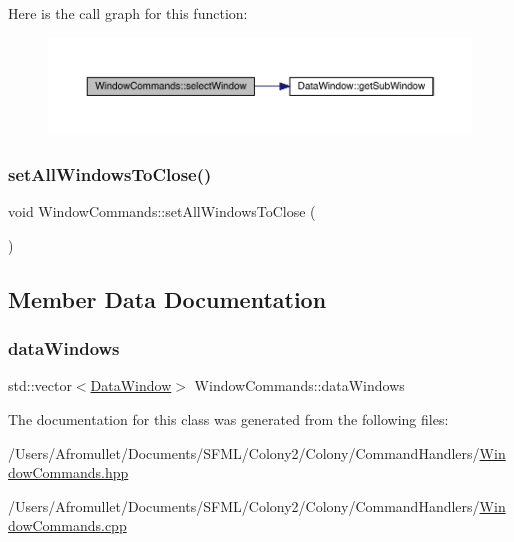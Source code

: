 Here is the call graph for this function\+:
\nopagebreak
\begin{figure}[H]
\begin{center}
\leavevmode
\includegraphics[width=350pt]{class_window_commands_a0e61beaebffb12c489ee277b84f74248_cgraph}
\end{center}
\end{figure}
\mbox{\label{class_window_commands_ac52c784736000a50d4d8ab43e0255f71}} 
\subsubsection{\texorpdfstring{set\+All\+Windows\+To\+Close()}{setAllWindowsToClose()}}
{\footnotesize\ttfamily void Window\+Commands\+::set\+All\+Windows\+To\+Close (\begin{DoxyParamCaption}{ }\end{DoxyParamCaption})}



\subsection{Member Data Documentation}
\mbox{\label{class_window_commands_aaa04e997ba5d2b2042cbe565c80cafbb}} 
\subsubsection{\texorpdfstring{data\+Windows}{dataWindows}}
{\footnotesize\ttfamily std\+::vector$<$\mbox{\hyperlink{class_data_window}{Data\+Window}}$>$ Window\+Commands\+::data\+Windows}



The documentation for this class was generated from the following files\+:\begin{DoxyCompactItemize}
\item 
/\+Users/\+Afromullet/\+Documents/\+S\+F\+M\+L/\+Colony2/\+Colony/\+Command\+Handlers/\mbox{\hyperlink{_window_commands_8hpp}{Window\+Commands.\+hpp}}\item 
/\+Users/\+Afromullet/\+Documents/\+S\+F\+M\+L/\+Colony2/\+Colony/\+Command\+Handlers/\mbox{\hyperlink{_window_commands_8cpp}{Window\+Commands.\+cpp}}\end{DoxyCompactItemize}
